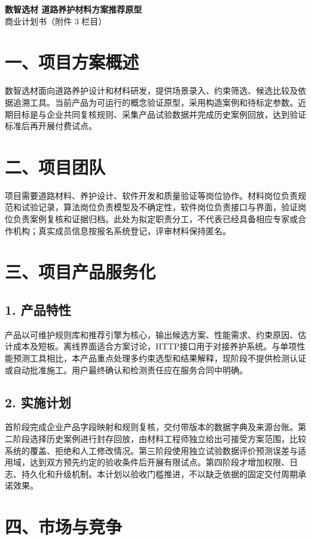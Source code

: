 \documentclass[UTF8,fontset=none,zihao=-4,a4paper]{ctexart}
\begin{document}
\begin{center}{\Large\bfseries\sffamily 数智选材 道路养护材料方案推荐原型}\\[4pt]{\large 商业计划书（附件 3 栏目）}\end{center}
\vspace{2pt}
\section*{一、项目方案概述}
数智选材面向道路养护设计和材料研发，提供场景录入、约束筛选、候选比较及依据追溯工具。当前产品为可运行的概念验证原型，采用构造案例和待标定参数。近期目标是与企业共同复核规则、采集产品试验数据并完成历史案例回放，达到验证标准后再开展付费试点。

\section*{二、项目团队}
项目需要道路材料、养护设计、软件开发和质量验证等岗位协作。材料岗位负责规范和试验记录，算法岗位负责模型及不确定性，软件岗位负责接口与界面，验证岗位负责案例复核和证据归档。此处为拟定职责分工，不代表已经具备相应专家或合作机构；真实成员信息按报名系统登记，评审材料保持匿名。

\section*{三、项目产品服务化}
\subsection*{1. 产品特性}
产品以可维护规则库和推荐引擎为核心，输出候选方案、性能需求、约束原因、估计成本及短板。离线界面适合方案讨论，HTTP接口用于对接养护系统。与单项性能预测工具相比，本产品重点处理多约束选型和结果解释，现阶段不提供检测认证或自动批准施工。用户最终确认和检测责任应在服务合同中明确。

\subsection*{2. 实施计划}
首阶段完成企业产品字段映射和规则复核，交付带版本的数据字典及来源台账。第二阶段选择历史案例进行封存回放，由材料工程师独立给出可接受方案范围，比较系统的覆盖、拒绝和人工修改情况。第三阶段使用独立试验数据评价预测误差与适用域，达到双方预先约定的验收条件后开展有限试点。第四阶段才增加权限、日志、持久化和升级机制。本计划以验收门槛推进，不以缺乏依据的固定交付周期承诺效果。

\section*{四、市场与竞争}
\end{document}
